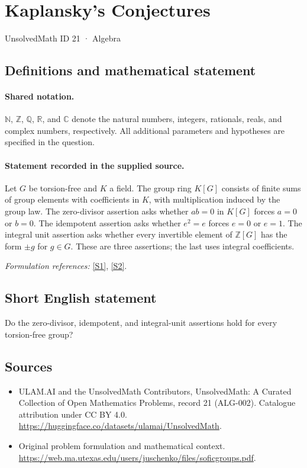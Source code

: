 \documentclass[11pt]{article}
\newcommand{\sref}[2]{\hyperlink{source:#1:#2}{[S#2]}}
\begin{document}
\setcounter{section}{20}
\section{Kaplansky's Conjectures}\label{21}
{\small UnsolvedMath ID 21 · Algebra}
\subsection{Definitions and mathematical statement}

\paragraph{Shared notation.}$\mathbb N$, $\mathbb Z$, $\mathbb Q$, $\mathbb R$, and $\mathbb C$ denote the natural numbers, integers, rationals, reals, and complex numbers, respectively. All additional parameters and hypotheses are specified in the question.


\paragraph{Statement recorded in the supplied source.}
Let $G$ be torsion-free and $K$ a field. The group ring $K[G]$ consists of finite sums of group elements with coefficients in $K$, with multiplication induced by the group law. The zero-divisor assertion asks whether $ab=0$ in $K[G]$ forces $a=0$ or $b=0$. The idempotent assertion asks whether $e^2=e$ forces $e=0$ or $e=1$. The integral unit assertion asks whether every invertible element of $\mathbb Z[G]$ has the form $\pm g$ for $g\in G$. These are three assertions; the last uses integral coefficients.
\par\smallskip\textit{Formulation references:} \sref{21}{1}, \sref{21}{2}.
\subsection{Short English statement}
Do the zero-divisor, idempotent, and integral-unit assertions hold for every torsion-free group?
\subsection{Sources}
\begin{itemize}
\item[\hypertarget{source:21:1}{S1}] ULAM.AI and the UnsolvedMath Contributors, UnsolvedMath: A Curated Collection of Open Mathematics Problems, record 21 (ALG-002). Catalogue attribution under CC BY 4.0.
\url{https://huggingface.co/datasets/ulamai/UnsolvedMath}.
\item[\hypertarget{source:21:2}{S2}] Original problem formulation and mathematical context.
\url{https://web.ma.utexas.edu/users/juschenko/files/soficgroups.pdf}.
\end{itemize}
\label{end:21}
\end{document}

